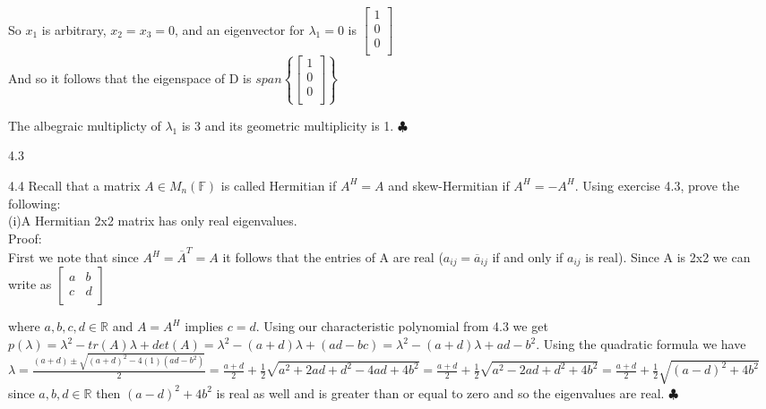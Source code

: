 \documentclass[12pt]{article}
\newenvironment{problems}{\begin{list}{}{\setlength{\labelwidth}{.7in}}}{\end{list}}
\begin{document}
\begin{problems}
 So $x_1$ is arbitrary, $x_2 = x_3 = 0$, and an eigenvector for $\lambda_1 = 0$ is $ \begin{bmatrix}
    1\\
    0 \\
    0 \\
  \end{bmatrix}$\\
  And so it follows that the eigenspace of D is $span\left\{ \begin{bmatrix}
    1\\
    0 \\
    0 \\
  \end{bmatrix} \right\}$
  
  The albegraic multiplicty of $\lambda_1$ is 3 and its geometric multiplicity is 1. \hfill $\clubsuit$\\
 
 \item[4.3]
 
 \item[4.4]
 Recall that a matrix $A\in M_n(\mathbb{F})$ is called Hermitian if $A^H =A$ and skew-Hermitian if $A^H = -A^H$. Using exercise 4.3, prove the following:\\
 
 (i)A Hermitian 2x2 matrix has only real eigenvalues.\\
 Proof: \\
 First we note that since $A^H = \overline A^T = A$ it follows that the entries of A are real ($a_{ij} = \overline a_{ij}$ if and only if $a_{ij}$ is real). Since A is 2x2 we can write as 
 $\begin{bmatrix}
    a & b \\
   c & d \\
 \end{bmatrix}
  $

  where $a,b,c,d\in \mathbb{R}$ and $A = A^H$ implies $c=d$. Using our characteristic polynomial from 4.3 we get $p(\lambda) = \lambda^2 - tr(A)\lambda +det(A) = \lambda^2 -(a+d)\lambda + (ad -bc )= \lambda^2 -(a+d)\lambda + ad -b^2$. Using the quadratic formula we have $ \lambda = \frac{(a+d) \pm \sqrt{(a+d)^2 - 4(1)(ad-b^2)    }   }{    2} = \frac{a+d}{2}+\frac{1}{2}\sqrt{a^2 + 2ad + d^2 -4ad + 4b^2} = \frac{a+d}{2}+\frac{1}{2}\sqrt{a^2 - 2ad + d^2 + 4b^2 } = 
  \frac{a+d}{2}+\frac{1}{2}\sqrt{(a-d)^2 + 4b^2  }$\\
  since $a,b,d \in \mathbb{R}$ then $(a-d)^2 + 4b^2$ is real as well and is greater than or equal to zero and so   the eigenvalues are real. \hfill $\clubsuit$\\ 
 

\end{problems}
\end{document}
